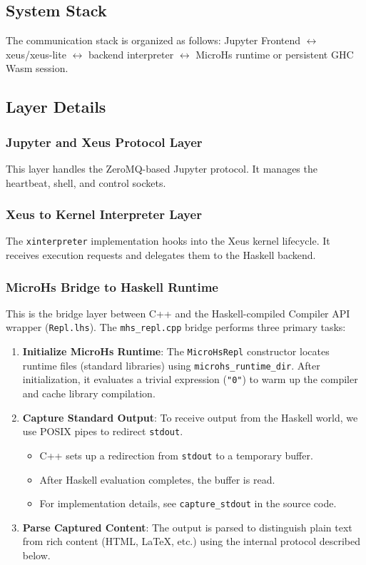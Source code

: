 \documentclass[11pt]{scrartcl}
\begin{document}
\subsection{System Stack}


The communication stack is organized as follows:
Jupyter Frontend \(\leftrightarrow\) xeus/xeus-lite \(\leftrightarrow\) backend interpreter \(\leftrightarrow\) MicroHs runtime or persistent GHC Wasm session.


\subsection{Layer Details}


\subsubsection{Jupyter and Xeus Protocol Layer}


This layer handles the ZeroMQ-based Jupyter protocol. It manages the heartbeat, shell, and control sockets.
\subsubsection{Xeus to Kernel Interpreter Layer}


The \texttt{xinterpreter} implementation hooks into the Xeus kernel lifecycle. It receives execution requests and delegates them to the Haskell backend.
\subsubsection{MicroHs Bridge to Haskell Runtime}


This is the bridge layer between C++ and the Haskell-compiled Compiler API wrapper (\texttt{Repl.lhs}).
The \texttt{mhs\_repl.cpp} bridge performs three primary tasks:
\begin{enumerate}
\item \textbf{Initialize MicroHs Runtime}:
   The \texttt{MicroHsRepl} constructor locates runtime files (standard libraries) using \texttt{microhs\_runtime\_dir}. After initialization, it evaluates a trivial expression (\texttt{"0"}) to warm up the compiler and cache library compilation.
\item \textbf{Capture Standard Output}:
   To receive output from the Haskell world, we use POSIX pipes to redirect \texttt{stdout}.
   \begin{itemize}
   \item C++ sets up a redirection from \texttt{stdout} to a temporary buffer.
   \item After Haskell evaluation completes, the buffer is read.
   \item For implementation details, see \texttt{capture\_stdout} in the source code.
   \end{itemize}
\item \textbf{Parse Captured Content}:
   The output is parsed to distinguish plain text from rich content (HTML, LaTeX, etc.) using the internal protocol described below.
\end{enumerate}
\end{document}
